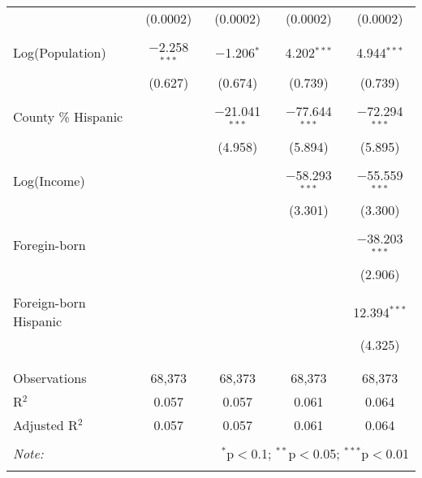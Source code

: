 \begin{table}[!htbp]
\begin{tabular}{@{\extracolsep{-5pt}}lcccc}
  & (0.0002) & (0.0002) & (0.0002) & (0.0002) \\ 
  & & & & \\ 
 Log(Population) & $-$2.258$^{***}$ & $-$1.206$^{*}$ & 4.202$^{***}$ & 4.944$^{***}$ \\ 
  & (0.627) & (0.674) & (0.739) & (0.739) \\ 
  & & & & \\ 
 County \% Hispanic &  & $-$21.041$^{***}$ & $-$77.644$^{***}$ & $-$72.294$^{***}$ \\ 
  &  & (4.958) & (5.894) & (5.895) \\ 
  & & & & \\ 
 Log(Income) &  &  & $-$58.293$^{***}$ & $-$55.559$^{***}$ \\ 
  &  &  & (3.301) & (3.300) \\ 
  & & & & \\ 
 Foregin-born &  &  &  & $-$38.203$^{***}$ \\ 
  &  &  &  & (2.906) \\ 
  & & & & \\ 
 Foreign-born Hispanic &  &  &  & 12.394$^{***}$ \\ 
  &  &  &  & (4.325) \\ 
  & & & & \\ 
\hline \\[-1.8ex] 
Observations & 68,373 & 68,373 & 68,373 & 68,373 \\ 
R$^{2}$ & 0.057 & 0.057 & 0.061 & 0.064 \\ 
Adjusted R$^{2}$ & 0.057 & 0.057 & 0.061 & 0.064 \\ 
\hline 
\hline \\[-1.8ex] 
\textit{Note:}  & \multicolumn{4}{r}{$^{*}$p$<$0.1; $^{**}$p$<$0.05; $^{***}$p$<$0.01} \\ 
 & \multicolumn{4}{r}{} \\ 
\end{tabular} 
\end{table} 
